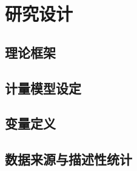 
\section{研究设计}

\subsection{理论框架}

\subsection{计量模型设定}

\subsection{变量定义}

\subsection{数据来源与描述性统计}
